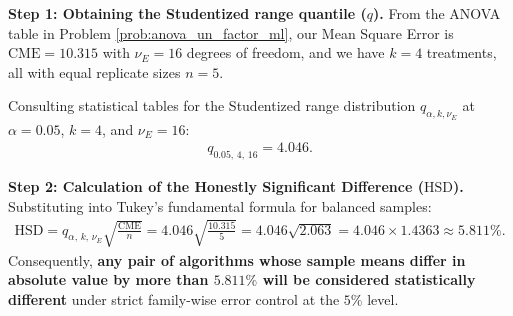 \begin{solproblema}
	\textbf{Step 1: Obtaining the Studentized range quantile ($q$).}
	From the ANOVA table in Problem \ref{prob:anova_un_factor_ml}, our Mean Square Error is $\text{CME} = 10.315$ with $\nu_E = 16$ degrees of freedom, and we have $k = 4$ treatments, all with equal replicate sizes $n = 5$.
	
	Consulting statistical tables for the Studentized range distribution $q_{\alpha, k, \nu_E}$ at $\alpha = 0.05$, $k = 4$, and $\nu_E = 16$:
	\begin{align}
		q_{0.05, \, 4, \, 16} = 4.046.
	\end{align}
	
	\textbf{Step 2: Calculation of the Honestly Significant Difference ($\text{HSD}$).}
	Substituting into Tukey's fundamental formula for balanced samples:
	\begin{align}
		\text{HSD} = q_{\alpha, \, k, \, \nu_E} \sqrt{\frac{\text{CME}}{n}} = 4.046 \sqrt{\frac{10.315}{5}} = 4.046 \sqrt{2.063} = 4.046 \times 1.4363 \approx 5.811\%.
	\end{align}
	Consequently, \textbf{any pair of algorithms whose sample means differ in absolute value by more than $5.811\%$ will be considered statistically different} under strict family-wise error control at the $5\%$ level.
	

\end{solproblema}
